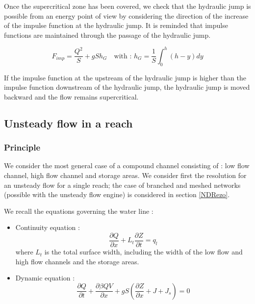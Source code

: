 Once the supercritical zone has been covered, we check that the hydraulic jump is possible from an energy point of view by considering the direction of the increase of the impulse function at the hydraulic jump. It is reminded that impulse functions are maintained through the passage of the hydraulic jump.

\begin{equation}
F_{imp} = \frac{Q^2}{S}+gSh_G \quad \mbox{with : }h_G=\frac{1}{S}\int_0^h(h-y)dy
\end{equation}

If the impulse function at the upstream of the hydraulic jump is higher than the impulse function downstream of the hydraulic jump, the hydraulic jump is moved backward and the flow remains supercritical.

\subsection{Unsteady flow in a reach}

\subsubsection{Principle}

We consider the most general case of a compound channel consisting of : low flow channel, high flow channel and storage areas. We consider first the resolution for an unsteady flow for a single reach; the case of branched and meshed networks (possible with the unsteady flow engine) is considered in section \ref{NDRezo}.

We recall the equations governing the water line :
\begin{itemize}
 \item Continuity equation :
   \begin{equation}
     \frac{\partial Q}{\partial x} + L_t \frac{\partial Z}{\partial t} = q_l
   \end{equation}
   where $L_t$ is the total surface width, including the width of the low flow and high flow channels and the storage areas.
  \item Dynamic equation :
    \begin{equation}
      \label{qmv2}
      \frac{\partial Q}{\partial t} + \frac{\partial \beta Q V}{\partial x} + g S \left( \frac{\partial Z}{\partial x} + J + J_s\right) = 0
    \end{equation}
\end{itemize}

